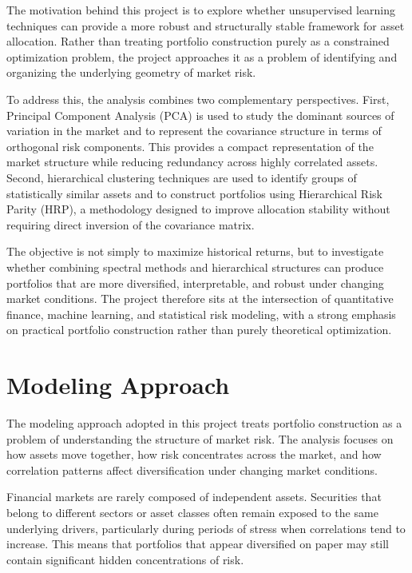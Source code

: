 \documentclass[
  12pt,
  letterpaper,
]{book}
\begin{document}
The motivation behind this project is to explore whether unsupervised
learning techniques can provide a more robust and structurally stable
framework for asset allocation. Rather than treating portfolio
construction purely as a constrained optimization problem, the project
approaches it as a problem of identifying and organizing the underlying
geometry of market risk.

To address this, the analysis combines two complementary perspectives.
First, Principal Component Analysis (PCA) is used to study the dominant
sources of variation in the market and to represent the covariance
structure in terms of orthogonal risk components. This provides a
compact representation of the market structure while reducing redundancy
across highly correlated assets. Second, hierarchical clustering
techniques are used to identify groups of statistically similar assets
and to construct portfolios using Hierarchical Risk Parity (HRP), a
methodology designed to improve allocation stability without requiring
direct inversion of the covariance matrix.

The objective is not simply to maximize historical returns, but to
investigate whether combining spectral methods and hierarchical
structures can produce portfolios that are more diversified,
interpretable, and robust under changing market conditions. The project
therefore sits at the intersection of quantitative finance, machine
learning, and statistical risk modeling, with a strong emphasis on
practical portfolio construction rather than purely theoretical
optimization.

\section{Modeling Approach}\label{modeling-approach-1}

The modeling approach adopted in this project treats portfolio
construction as a problem of understanding the structure of market risk.
The analysis focuses on how assets move together, how risk concentrates
across the market, and how correlation patterns affect diversification
under changing market conditions.

Financial markets are rarely composed of independent assets. Securities
that belong to different sectors or asset classes often remain exposed
to the same underlying drivers, particularly during periods of stress
when correlations tend to increase. This means that portfolios that
appear diversified on paper may still contain significant hidden
concentrations of risk.
\end{document}
